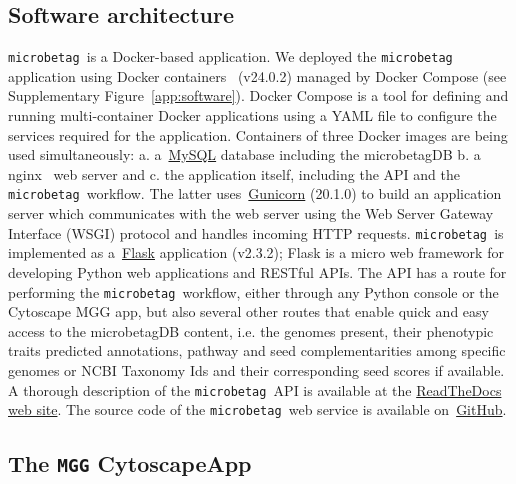 \documentclass[sn-mathphys,Numbered]{sn-jnl}  %
\theoremstyle{thmstyleone}%
\theoremstyle{thmstyletwo}%
\theoremstyle{thmstylethree}%
\newcommand{\microbetag}{\texttt{microbetag }}
\begin{document}
    \subsection*{Software architecture}
    \label{subsec:webserver}


        \microbetag is a Docker-based application.
        We deployed the \microbetag application using Docker containers~\cite{merkel2014docker} (v24.0.2)  managed by Docker Compose (see Supplementary Figure~\ref{app:software}).
        Docker Compose is a tool for defining and running multi-container Docker applications using a YAML file to configure the services required for the application.
        Containers of three Docker images are being used simultaneously:
        a. a~\href{https://www.mysql.com}{MySQL} database including the microbetagDB
        b. a nginx~\cite{nginx} web server and 
        c. the application itself, including the API and the \microbetag workflow.
        The latter uses~\href{https://gunicorn.org}{Gunicorn} (20.1.0) to build an application server which communicates with the web server using the Web Server Gateway Interface (WSGI) protocol and handles incoming HTTP requests.
        \microbetag is implemented as a~\href{https://flask.palletsprojects.com/en/3.0.x/}{Flask} application (v2.3.2); 
        Flask is a micro web framework for developing Python web applications and RESTful APIs.
        The API has a route for performing the \microbetag workflow, either through any Python console or the Cytoscape MGG app, but also several other routes that enable quick and easy access to the microbetagDB content, i.e. the genomes present, their phenotypic traits predicted annotations, pathway and seed complementarities among specific genomes or NCBI Taxonomy Ids and their corresponding seed scores if available.
        A thorough description of the \microbetag API is available at the \href{https://hariszaf.github.io/microbetag/docs/api/}{ReadTheDocs web site}. 
        The source code of the \microbetag web service is available on~\href{https://github.com/msysbio/microbetagApp/}{GitHub}.


    \subsection*{The \texttt{MGG} CytoscapeApp}
    \label{subsec:build-cytoapp}
\end{document}
